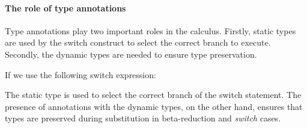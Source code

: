 \paragraph{The role of type annotations}
Type annotations play two important roles in the calculus.
Firstly, static types are used by the switch construct
to select the correct branch to execute. Secondly, the
dynamic types are needed to ensure type preservation.
\begin{comment}
Before going
into the details of operational semantics, it is important to recall
the definition of pre-values, annotated values and values.
An integer expression $[[i]]$ is not a value unless annotated.
Non-annotated lambda expressions ($[[\x.e]]$) are values but cannot appear at left
side in function applications.
Only annotated values $[[w]]$ can appear at left side in function applications.
Annotated values consist of annotated pre-values. That is, it consists of
$[[i:A]]$ and $[[\x.e:(A1->B1):(A2->B2)]]$. This is
because that the orginal static type is tracked by the operational semantics.
Therefore, we can end up in a value such as $[[1 : Int]]$ or $[[1 : Top]]$,
and those two values can behave differently in some contexts.
\bruno{Give an example here}
For functions the static type is not enough and we also need the dynamic type
(which is the original type of the lambda).
For example, if we have:
$e = [[\x.x:Int->Int:(Int->Int)\/(Bool->Bool)]]$, then the static type of $e$ is
$[[(Int->Int)\/(Bool->Bool)]]$ and the, more precise, dynamic type is
$[[Int->Int]]$.
\end{comment}
If we use the following switch expression:


The static type is used to select the correct branch of the switch statement.
The presence of annotations with the dynamic types, on the other hand,
ensures that types are preserved during substitution in
beta-reduction and \emph{switch} cases.

